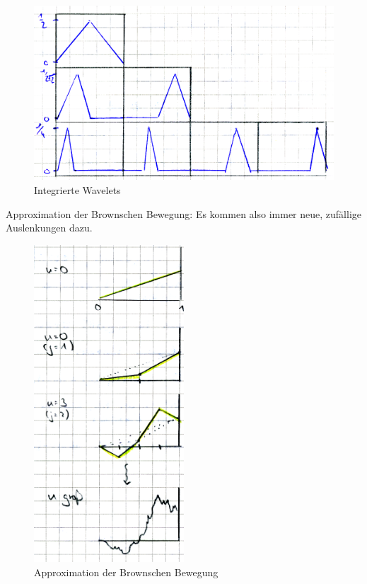 \begin{figure}[H]
	\begin{center}
		\includegraphics[width=1\textwidth]{./pics/WTHMscan002.png}
		\caption{Integrierte Wavelets}
		\label{AbbHaarIntegrierteWavelets}
	\end{center}
\end{figure}

Approximation der Brownschen Bewegung:
Es kommen also immer neue, zufällige Auslenkungen dazu.

\begin{figure}[H]
	\begin{center}
		\includegraphics[width=0.5\textwidth]{./pics/WTHMscan003.png}
		\caption{Approximation der Brownschen Bewegung}
		\label{AbbBBn}
	\end{center}
\end{figure}

